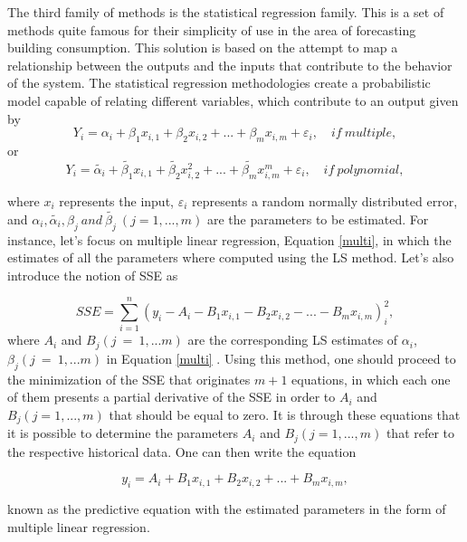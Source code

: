 The third family of methods is the statistical regression family. This is a set of methods quite famous for their simplicity of use in the area of forecasting building consumption. This solution is based on the attempt to map a relationship between the outputs and the inputs that contribute to the behavior of the system. The statistical regression methodologies create a probabilistic model capable of relating different variables, which contribute to an output given by 
\begin{equation}
       Y_i = \alpha_i + \beta_1 x_{i,1} + \beta_2 x_{i,2} + ... + \beta_m x_{i,m} + \varepsilon_i,\quad if \  multiple,
\label{multi}
\end{equation}
or
\begin{equation}
       Y_i = \tilde{\alpha_i} + \tilde{\beta_1} x_{i,1} + \tilde{\beta_2} x_{i,2}^2 + ... + \tilde{\beta_m} x_{i,m}^m + \varepsilon_i,\quad if \  polynomial,
\label{poly}
\end{equation}

where $x_i$ represents the input, $\varepsilon_i$ represents a random normally distributed error, and  $\alpha_i, \tilde{\alpha_i}, \beta_j\  and\  \tilde{\beta_j}\ (j=1,...,m)$ are the parameters to be estimated. For instance, let's focus on multiple linear regression, Equation \ref{multi}, in which the estimates of all the parameters where computed using the \ac{LS} method. Let's also introduce the notion of \ac{SSE} as

\begin{equation}
       SSE = \sum_{i=1}^n (y_i-A_i-B_1 x_{i,1} - B_2 x_{i,2} - ... - B_m x_{i,m})_i^2,
\label{SSE}
\end{equation}
 where $A_i$ and $B_j(j\ =\ 1,...m)$ are the corresponding \ac{LS} estimates of $\alpha_i$, $\beta_j(j\ =\ 1,...m)$ in Equation \ref{multi} \cite{review2017}. Using this method, one should proceed to the minimization of the SSE that originates $m+1$ equations, in which each one of them presents a partial derivative of the \ac{SSE} in order to $A_i$ and $B_j(j=1,...,m)$ that should be equal to zero. It is through these equations that it is possible to determine the parameters $A_i$ and $B_j(j=1,...,m)$ that refer to the respective historical data. One can then write the equation
 
\begin{equation}
       y_i = A_i + B_1 x_{i,1} +  B_2 x_{i,2} + ... + B_m x_{i,m},
\label{y_i}
\end{equation}

known as the predictive equation with the estimated parameters in the form of multiple linear regression.
 
